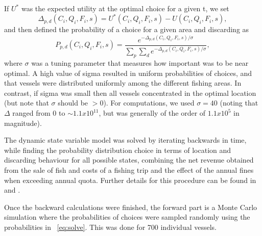 \documentclass[12pt,oneline,a4paper,numbib]{ouparticle}
\numberwithin{equation}{subsection} %
\begin{document}
If $U^*$ was the expected utility at the optimal choice for a given t, we set
\begin{equation}
\Delta_{p, d}(C_i, Q_i, F_i, s) =  U^* (C_i, Q_i, F_i, s) - U (C_i, Q_i, F_i, s),
\end{equation}
and then defined the probability of a choice for a given area and discarding as	
\begin{equation} \label{eq:solve}
P_{p, d}(C_i, Q_i, F_i, s) = \frac
                {e^{ -\Delta_{p, d}(C_i, Q_i, F_i, s)/\sigma}}
                {\sum_p \sum_d e^{ -\Delta_{p, d}(C_i, Q_i, F_i, s)/\sigma}},
\end{equation}
where $\sigma$ was a tuning parameter that measures how important was to be near optimal. A high value of sigma resulted in uniform probabilities of choices, and that vessels were distributed uniformly among the different fishing areas. In contrast, if sigma was small then all vessels concentrated in the optimal location (but note that $\sigma$ should be $> 0$). For computations, we used $\sigma = 40$ (noting that $\Delta$ ranged from 0 to $\sim 1.1 x 10^{11}$, but was generally of the order of $1.1 x 10^5$ in magnitude).

The dynamic state variable model was solved by iterating backwards in time, while finding the probability distribution choice in terms of location and discarding behaviour for all possible states, combining the net revenue obtained from the sale of fish and costs of a fishing trip and the effect of the annual fines when exceeding annual quota. Further details for this procedure can be found in \cite{Alzorriz2018, Batsleer2016} and \cite{Dowling2011}.

Once the backward calculations were finished, the forward part is a Monte Carlo simulation where the probabilities of choices were sampled randomly using the probabilities in ~\ref{eq:solve}. This was done for 700 individual vessels. 
\end{document}
